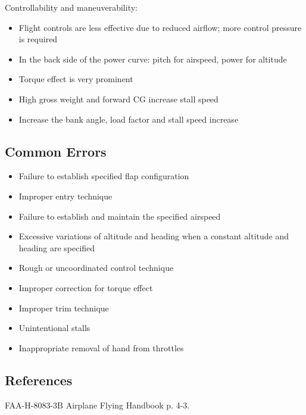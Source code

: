 Controllability and maneuverability:
\begin{itemize}
  \item Flight controls are less effective due to reduced airflow; more control
    pressure is required
  \item In the back side of the power curve: pitch for airspeed, power for
    altitude
  \item Torque effect is very prominent
  \item High gross weight and forward CG increase stall speed
  \item Increase the bank angle, load factor and stall speed increase
\end{itemize}

\subsection{Common Errors}

\begin{itemize}
  \item Failure to establish specified flap configuration
  \item Improper entry technique
  \item Failure to establish and maintain the specified airspeed
  \item Excessive variations of altitude and heading when a constant altitude
    and heading are specified
  \item Rough or uncoordinated control technique
  \item Improper correction for torque effect
  \item Improper trim technique
  \item Unintentional stalls
  \item Inappropriate removal of hand from throttles
\end{itemize}

\subsection{References}

FAA-H-8083-3B Airplane Flying Handbook p. 4-3.

